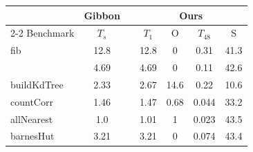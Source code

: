 \setlength{\tabcolsep}{0.3em}
\renewcommand{\arraystretch}{1.15}
\begin{tabular}{@{}l cc cccc@{}}
    \toprule
    & Gibbon & \phantom{} & \multicolumn{4}{c}{Ours} \\
    \cmidrule{2-2}
    \cmidrule{4-7}
    Benchmark & $T_s$ && $T_1$ & O & $T_{48}$ & S \\

    \midrule
    

    fib & 12.8 && 12.8 & 0 & 0.31 & 41.3 \\

    \buildfib{} & 4.69 && 4.69 & 0 & 0.11 & 42.6 \\




    buildKdTree & 2.33 && 2.67 & 14.6 & 0.22 & 10.6 \\

    countCorr & 1.46  && 1.47 & 0.68 & 0.044 & 33.2 \\

    allNearest & 1.0 && 1.01 & 1 & 0.023 & 43.5 \\



    barnesHut & 3.21 && 3.21 & 0 & 0.074 & 43.4 \\


\end{tabular}

